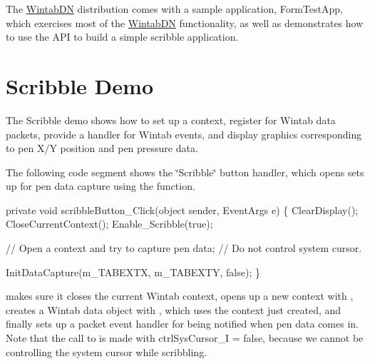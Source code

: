 The \mbox{\hyperlink{namespace_wintab_d_n}{Wintab\+DN}} distribution comes with a sample application, Form\+Test\+App, which exercises most of the \mbox{\hyperlink{namespace_wintab_d_n}{Wintab\+DN}} functionality, as well as demonstrates how to use the A\+PI to build a simple scribble application.\hypertarget{page2_scribbleDemo_sec}{}\section{Scribble Demo}\label{page2_scribbleDemo_sec}
The Scribble demo shows how to set up a context, register for Wintab data packets, provide a handler for Wintab events, and display graphics corresponding to pen X/Y position and pen pressure data.

The following code segment shows the \char`\"{}\+Scribble\char`\"{} button handler, which opens sets up for pen data capture using the {} function. 
\begin{DoxyCode}
\textcolor{keyword}{private} \textcolor{keywordtype}{void} scribbleButton\_Click(\textcolor{keywordtype}{object} sender, EventArgs e)
\{
    ClearDisplay();
    CloseCurrentContext();
    Enable\_Scribble(\textcolor{keyword}{true});

    \textcolor{comment}{// Open a context and try to capture pen data;}
    \textcolor{comment}{// Do not control system cursor.}

    InitDataCapture(m\_TABEXTX, m\_TABEXTY, \textcolor{keyword}{false});
\}
\end{DoxyCode}


{} makes sure it closes the current Wintab context, opens up a new context with {}, creates a Wintab data object with {}, which uses the context just created, and finally sets up a packet event handler for being notified when pen data comes in. Note that the call to {} is made with ctrl\+Sys\+Cursor\+\_\+I = false, because we cannot be controlling the system cursor while scribbling.


